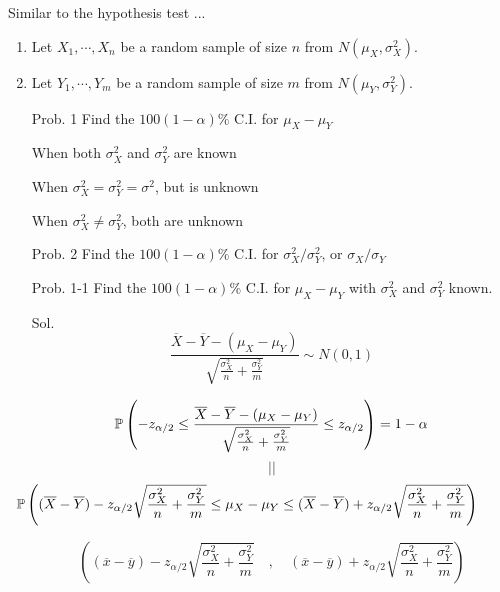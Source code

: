 \begin{frame}
	\centering
	Similar to the hypothesis test ...
\end{frame}
\begin{frame}
\begin{enumerate}
\item Let $X_1,\cdots, X_n$ be a random sample of size $n$ from $N(\mu_X,\sigma^2_X)$.	\\[1em]
\item Let $Y_1,\cdots, Y_m$ be a random sample of size $m$ from $N(\mu_Y,\sigma^2_Y)$.
\vfill
\item[Prob. 1] Find the $100(1-\alpha)\%$ C.I. for $\mu_X-\mu_Y$\\[2em]
\item[]When both $\sigma^2_X$ and $\sigma^2_Y$ are known\\[1em]
\item[]When $\sigma^2_X = \sigma^2_Y=\sigma^2$, but is unknown\\[1em]
\item[]When $\sigma^2_X \ne \sigma^2_Y$, both are unknown
\pause \hspace{3em}
\vfill
\item[Prob. 2] Find the $100(1-\alpha)\%$ C.I. for $\sigma_X^2/\sigma_Y^2$, or $\sigma_X/\sigma_Y$\\[2em]
\end{enumerate}
\end{frame}
\begin{frame}
\begin{enumerate}
\item[Prob. 1-1] Find the $100(1-\alpha)\%$ C.I. for $\mu_X-\mu_Y$ with $\sigma^2_X$ and $\sigma^2_Y$ known.
	\vfill
\item[Sol.]
	\[
		\frac{\overline{X}-\overline{Y} - (\mu_X-\mu_Y)}{\sqrt{\frac{\sigma_X^2}{n} + \frac{\sigma_Y^2}{m} }}\sim N(0,1)
	\]
	\vfill
\item[]
	\[
		\mathbb{P} \left(-z_{\alpha/2} \le \frac{\overline{X}-\overline{Y} - (\mu_X-\mu_Y)}{\sqrt{\frac{\sigma_X^2}{n} + \frac{\sigma_Y^2}{m} }}\le z_{\alpha/2}\right )=1-\alpha
	\]
	\[||\]
	\[
		\hspace{-3.5em}	\bbP \left(
			(\overline{X}-\overline{Y})-z_{\alpha/2} \sqrt{\frac{\sigma_X^2}{n} + \frac{\sigma_Y^2}{m}}
			\le  \mu_X-\mu_Y \le
			(\overline{X}-\overline{Y})+z_{\alpha/2} \sqrt{\frac{\sigma_X^2}{n} + \frac{\sigma_Y^2}{m}}
		\right )
	\]
	\vfill
\item[]
	\[
		\left(
			(\overline{x}-\overline{y})-z_{\alpha/2} \sqrt{\frac{\sigma_X^2}{n} + \frac{\sigma_Y^2}{m}}
\quad,\quad
(\overline{x}-\overline{y})+z_{\alpha/2} \sqrt{\frac{\sigma_X^2}{n} + \frac{\sigma_Y^2}{m}}
\right )
	\]
	\myEnd
\end{enumerate}
\end{frame}

